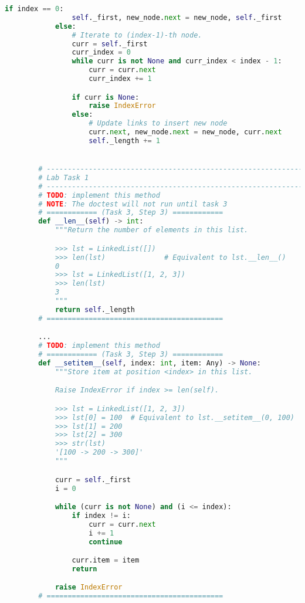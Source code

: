 \documentclass[12pt]{article}
\begin{document}
\begin{enumerate}[1.]
\begin{mdframed}
\begin{lstlisting}[language=python,caption={task\_3\_step\_3\_solution.py}]
            if index == 0:
                self._first, new_node.next = new_node, self._first
            else:
                # Iterate to (index-1)-th node.
                curr = self._first
                curr_index = 0
                while curr is not None and curr_index < index - 1:
                    curr = curr.next
                    curr_index += 1

                if curr is None:
                    raise IndexError
                else:
                    # Update links to insert new node
                    curr.next, new_node.next = new_node, curr.next
                    self._length += 1


        # ------------------------------------------------------------------------
        # Lab Task 1
        # ------------------------------------------------------------------------
        # TODO: implement this method
        # NOTE: The doctest will not run until task 3
        # ============ (Task 3, Step 3) ============
        def __len__(self) -> int:
            """Return the number of elements in this list.

            >>> lst = LinkedList([])
            >>> len(lst)              # Equivalent to lst.__len__()
            0
            >>> lst = LinkedList([1, 2, 3])
            >>> len(lst)
            3
            """
            return self._length
        # ==========================================

        ...
        # TODO: implement this method
        # ============ (Task 3, Step 3) ============
        def __setitem__(self, index: int, item: Any) -> None:
            """Store item at position <index> in this list.

            Raise IndexError if index >= len(self).

            >>> lst = LinkedList([1, 2, 3])
            >>> lst[0] = 100  # Equivalent to lst.__setitem__(0, 100)
            >>> lst[1] = 200
            >>> lst[2] = 300
            >>> str(lst)
            '[100 -> 200 -> 300]'
            """

            curr = self._first
            i = 0

            while (curr is not None) and (i <= index):
                if index != i:
                    curr = curr.next
                    i += 1
                    continue

                curr.item = item
                return

            raise IndexError
        # ==========================================
    \end{lstlisting}
    \end{mdframed}


\end{enumerate}
\end{document}
